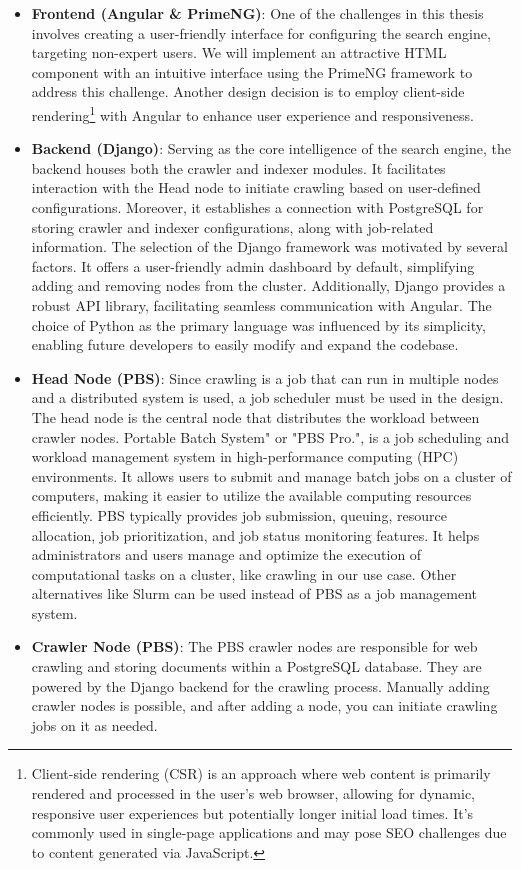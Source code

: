 \begin{itemize}
  \item[] \textbf{Frontend (Angular \& PrimeNG)}: One of the challenges in this thesis involves creating a user-friendly interface for configuring the search engine, targeting non-expert users. We will implement an attractive HTML component with an intuitive interface using the PrimeNG framework to address this challenge. Another design decision is to employ client-side rendering\footnote{Client-side rendering (CSR) is an approach where web content is primarily rendered and processed in the user's web browser, allowing for dynamic, responsive user experiences but potentially longer initial load times. It's commonly used in single-page applications and may pose SEO challenges due to content generated via JavaScript.} with Angular to enhance user experience and responsiveness.
  \item[] \textbf{Backend (Django)}: Serving as the core intelligence of the search engine, the backend houses both the crawler and indexer modules. It facilitates interaction with the Head node to initiate crawling based on user-defined configurations. Moreover, it establishes a connection with PostgreSQL for storing crawler and indexer configurations, along with job-related information. The selection of the Django framework was motivated by several factors. It offers a user-friendly admin dashboard by default, simplifying adding and removing nodes from the cluster. Additionally, Django provides a robust API library, facilitating seamless communication with Angular. The choice of Python as the primary language was influenced by its simplicity, enabling future developers to easily modify and expand the codebase.
  \item[] \textbf{Head Node (PBS)}: Since crawling is a job that can run in multiple nodes and a distributed system is used, a job scheduler must be used in the design. The head node is the central node that distributes the workload between crawler nodes. Portable Batch System" or "PBS Pro.", is a job scheduling and workload management system in high-performance computing (HPC) environments. It allows users to submit and manage batch jobs on a cluster of computers, making it easier to utilize the available computing resources efficiently. PBS typically provides job submission, queuing, resource allocation, job prioritization, and job status monitoring features. It helps administrators and users manage and optimize the execution of computational tasks on a cluster, like crawling in our use case. Other alternatives like Slurm can be used instead of PBS as a job management system.
  \item[] \textbf{Crawler Node (PBS)}: The PBS crawler nodes are responsible for web crawling and storing documents within a PostgreSQL database. They are powered by the Django backend for the crawling process. Manually adding crawler nodes is possible, and after adding a node, you can initiate crawling jobs on it as needed.
\end{itemize}

